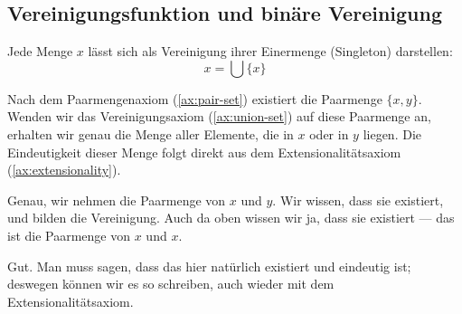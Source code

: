 \subsection{Vereinigungsfunktion und binäre Vereinigung}
\begin{math-stroke}

\begin{example}
Jede Menge $x$ lässt sich als Vereinigung ihrer Einermenge (Singleton) darstellen:
\[
x = \bigcup \{x\}
\]
\end{example}

\begin{explanation-of-steps}
Nach dem Paarmengenaxiom (\cref{ax:pair-set}) existiert die Paarmenge $\{x, y\}$. Wenden wir das Vereinigungsaxiom (\cref{ax:union-set}) auf diese Paarmenge an, erhalten wir genau die Menge aller Elemente, die in $x$ oder in $y$ liegen. Die Eindeutigkeit dieser Menge folgt direkt aus dem Extensionalitätsaxiom (\cref{ax:extensionality}).
\end{explanation-of-steps}
\end{math-stroke}

\begin{spoken-clean}[00:17:17 - 00:20:01]
Genau, wir nehmen die Paarmenge von $x$ und $y$. Wir wissen, dass sie existiert, und bilden die Vereinigung. Auch da oben wissen wir ja, dass sie existiert --- das ist die Paarmenge von $x$ und $x$.

Gut. Man muss sagen, dass das hier natürlich existiert und eindeutig ist; deswegen können wir es so schreiben, auch wieder mit dem Extensionalitätsaxiom.
\end{spoken-clean}

